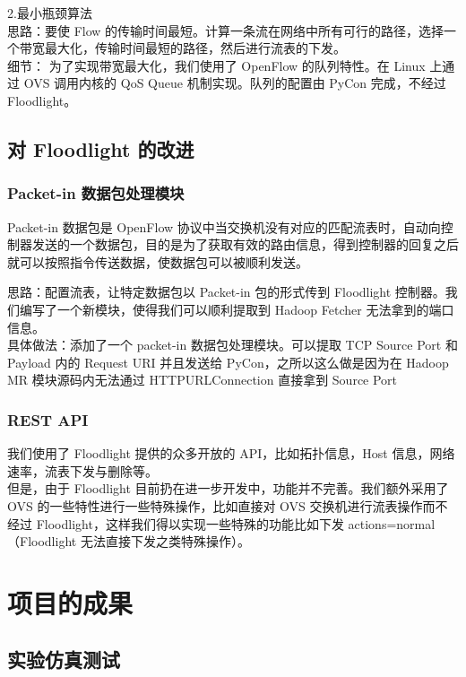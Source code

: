\documentclass[a4paper, 11pt]{article}                                                   %
\begin{document}
\begin{CJK*}{UTF8}{song}
2.最小瓶颈算法\\
思路：要使 Flow 的传输时间最短。计算一条流在网络中所有可行的路径，选择一个带宽最大化，传输时间最短的路径，然后进行流表的下发。\\

细节：
为了实现带宽最大化，我们使用了 OpenFlow 的队列特性。在 Linux 上通过 OVS 调用内核的 QoS Queue 机制实现。队列的配置由 PyCon 完成，不经过 Floodlight。

\subsection{对 Floodlight 的改进}

\subsubsection{Packet-in 数据包处理模块}

Packet-in 数据包是 OpenFlow 协议中当交换机没有对应的匹配流表时，自动向控制器发送的一个数据包，目的是为了获取有效的路由信息，得到控制器的回复之后就可以按照指令传送数据，使数据包可以被顺利发送。

思路：配置流表，让特定数据包以 Packet-in 包的形式传到 Floodlight 控制器。我们编写了一个新模块，使得我们可以顺利提取到 Hadoop Fetcher 无法拿到的端口信息。\\

具体做法：添加了一个 packet-in 数据包处理模块。可以提取 TCP Source Port 和 Payload 内的 Request URI 并且发送给 PyCon，之所以这么做是因为在 Hadoop MR 模块源码内无法通过 HTTPURLConnection 直接拿到 Source Port\\

\subsubsection{REST API}
我们使用了 Floodlight 提供的众多开放的 API，比如拓扑信息，Host 信息，网络速率，流表下发与删除等。\\
但是，由于 Floodlight 目前扔在进一步开发中，功能并不完善。我们额外采用了 OVS 的一些特性进行一些特殊操作，比如直接对 OVS 交换机进行流表操作而不经过 Floodlight，这样我们得以实现一些特殊的功能比如下发 actions=normal（Floodlight 无法直接下发之类特殊操作）。

\section{项目的成果}
\subsection{实验仿真测试}


\end{CJK*}
\end{document}
